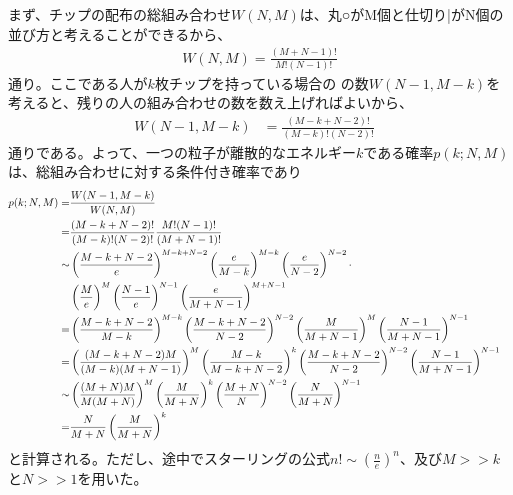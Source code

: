 \documentclass[ %
  platex,%
  papersize,%
  twocolumn,
  landscape
]{jsarticle}
\begin{document}
まず、チップの配布の総組み合わせ$W(N,M)$は、丸○がM個と仕切り|がN個の並び方と考えることができるから、
\begin{align}
  W(N,M)=\frac{(M+N-1)!}{M!(N-1)!}
\end{align}
通り。ここである人が$k$枚チップを持っている場合の
の数$W(N-1,M-k)$を考えると、残りの人の組み合わせの数を数え上げればよいから、
\begin{align}
  W(N-1,M-k)&=\frac{(M-k+N-2)!}{(M-k)!(N-2)!}&
\end{align}
通りである。よって、一つの粒子が離散的なエネルギー$k$である確率$p(k;N,M)$は、総組み合わせに対する条件付き確率であり
\begin{align}
  p(k;N,M)=&\frac{W(N-1,M-k)}{W(N,M)}&\\
  =&\frac{(M-k+N-2)!}{(M-k)!(N-2)!}\frac{M!(N-1)!}{(M+N-1)!}&\\
  \sim&\left(\frac{M-k+N-2}{e}\right)^{M-k+N-2}\left(\frac{e}{M-k}\right)^{M-k}\left(\frac{e}{N-2}\right)^{N-2}\cdot\relax&\\\nonumber&\left(\frac{M}{e}\right)^{M}\left(\frac{N-1}{e}\right)^{N-1}\left(\frac{e}{M+N-1}\right)^{M+N-1}&\\
  =&\left(\frac{M-k+N-2}{M-k}\right)^{M-k}\left(\frac{M-k+N-2}{N-2}\right)^{N-2}\left(\frac{M}{M+N-1}\right)^{M}\left(\frac{N-1}{M+N-1}\right)^{N-1}&\\
  =&\left(\frac{(M-k+N-2)M}{(M-k)(M+N-1)}\right)^{M}\left(\frac{M-k}{M-k+N-2}\right)^{k}\left(\frac{M-k+N-2}{N-2}\right)^{N-2}\left(\frac{N-1}{M+N-1}\right)^{N-1}&\\
  \sim&\left(\frac{(M+N)M}{M(M+N)}\right)^{M}\left(\frac{M}{M+N}\right)^{k}\left(\frac{M+N}{N}\right)^{N-2}\left(\frac{N}{M+N}\right)^{N-1}&\\
  =&\frac{N}{M+N}\left(\frac{M}{M+N}\right)^{k}&
\end{align}
と計算される。ただし、途中でスターリングの公式$n!\sim(\frac{n}{e})^n$、及び$M>>k$と$N>>1$を用いた。
\end{document}
